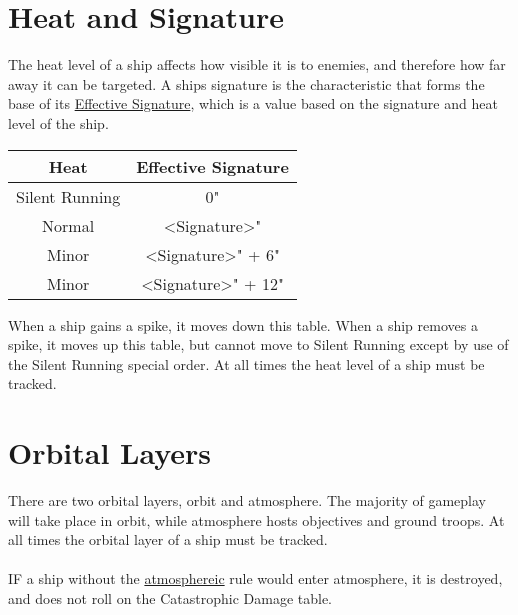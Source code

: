 \section{Heat and Signature}
The heat level of a ship affects how visible it is to enemies, and therefore how far away it can be targeted. A ships signature is the characteristic that forms the base of its \underline{Effective Signature}, which is a value based on the signature and heat level of the ship.

\begin{center}
	\begin{tabular}{|cc|}
		\hline
		\textbf{Heat} & \textbf{Effective Signature} \\
		\hline
		Silent Running &  0" \\
		\gray Normal & <Signature>"\\
		Minor & <Signature>" + 6" \\
		\gray Minor & <Signature>" + 12" \\
		\hline	
	\end{tabular} 
\end{center}
When a ship gains a spike, it moves down this table. When a ship removes a spike, it moves up this table, but cannot move to Silent Running except by use of the Silent Running special order. At all times the heat level of a ship must be tracked.

\section{Orbital Layers}
There are two orbital layers, orbit and atmosphere. The majority of gameplay will take place in orbit, while atmosphere hosts objectives and ground troops. At all times the orbital layer of a ship must be tracked.\\\\
IF a ship without the \underline{atmosphereic} rule would enter atmosphere, it is destroyed, and does not roll on the Catastrophic Damage table.

